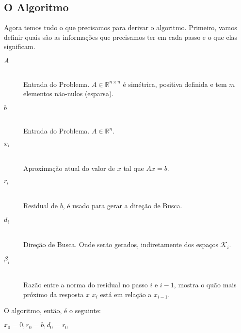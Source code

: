 \documentclass[
10pt, %
a4paper, %
oneside, %
headinclude,footinclude, %
BCOR5mm, %
]{scrartcl}
\begin{document}
\subsection{O Algoritmo}
Agora temos tudo o que precisamos para derivar o algoritmo. Primeiro, vamos definir quais são as informações que precisamos ter em cada passo e o que elas significam. \\
\begin{description}
    \item[$A$] \hfill \\
    Entrada do Problema. $A \in \mathbb{R}^{n \times n}$ é simétrica, positiva definida e tem $m$ elementos não-nulos (esparsa).
    \item[$b$] \hfill \\
    Entrada do Problema. $A \in \mathbb{R}^{n}$.
    \item[$x_i$] \hfill \\
    Aproximação atual do valor de $x$ tal que $Ax = b$.
    \item[$r_i$] \hfill \\
    Residual de $b$, é usado para gerar a direção de Busca.
    \item[$d_i$] \hfill \\
    Direção de Busca. Onde serão gerados, indiretamente dos espaços $\mathcal{K}_i$.
    \item[$\beta_i$] \hfill \\
    Razão entre a norma do residual no passo $i$ e $i-1$, mostra o quão mais próximo da resposta $x$ $x_i$ está em relação a $x_{i-1}$.
\end{description}
O algoritmo, então, é o seguinte: ~\cite[p.~294]{trefethen1997numerical}
\begin{algorithm}[]
    $x_0 = 0, r_0 = b, d_0 = r_0$ \\
\end{algorithm}
\end{document}
